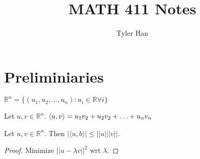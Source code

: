 \documentclass[12pt, letterpaper]{article}
\title{MATH 411 Notes}
\author{Tyler Han}
\begin{document}
\maketitle

\section{Preliminiaries}

%
%

\begin{definition} 
	$\mathbb{R}^n = \{(u_1,u_2,\hdots,u_n) : u_i \in \mathbb{R} \forall i\}$
\end{definition}

\begin{definition} 
	Let $u,v\in \mathbb{R}^n$. $\left\langle u , v \right\rangle = u_1v_2 + u_2v_2 + \hdots + u_nv_n$
\end{definition}

\begin{theorem} 
	Let $u,v\in \mathbb{R}^n$. Then $|\langle u,b \rangle| \leq ||u|||v||$.
\end{theorem}

\begin{proof} 
	Minimize $||u-\lambda v ||^2$ wrt $\lambda$.
\end{proof}
\end{document}
